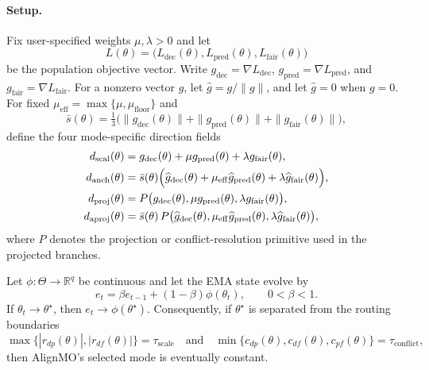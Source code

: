 
\paragraph{Setup.}
Fix user-specified weights $\mu,\lambda>0$ and let
\[
L(\theta)=\bigl(L_{\mathrm{dec}}(\theta),L_{\mathrm{pred}}(\theta),L_{\mathrm{fair}}(\theta)\bigr)
\]
be the population objective vector. Write
$g_{\mathrm{dec}}=\nabla L_{\mathrm{dec}}$,
$g_{\mathrm{pred}}=\nabla L_{\mathrm{pred}}$,
and $g_{\mathrm{fair}}=\nabla L_{\mathrm{fair}}$.
For a nonzero vector $g$, let $\widehat g=g/\|g\|$, and let $\widehat g=0$ when $g=0$.
For fixed $\mu_{\mathrm{eff}}=\max\{\mu,\mu_{\mathrm{floor}}\}$ and
\[
\bar s(\theta)=\tfrac13\bigl(\|g_{\mathrm{dec}}(\theta)\|+\|g_{\mathrm{pred}}(\theta)\|+\|g_{\mathrm{fair}}(\theta)\|\bigr),
\]
define the four mode-specific direction fields
\begin{align*}
d_{\mathrm{scal}}(\theta)
&= g_{\mathrm{dec}}(\theta)+\mu g_{\mathrm{pred}}(\theta)+\lambda g_{\mathrm{fair}}(\theta),\\
d_{\mathrm{anch}}(\theta)
&= \bar s(\theta)\Bigl(\widehat g_{\mathrm{dec}}(\theta)
   +\mu_{\mathrm{eff}}\widehat g_{\mathrm{pred}}(\theta)
   +\lambda \widehat g_{\mathrm{fair}}(\theta)\Bigr),\\
d_{\mathrm{proj}}(\theta)
&= P\bigl(g_{\mathrm{dec}}(\theta),\mu g_{\mathrm{pred}}(\theta),\lambda g_{\mathrm{fair}}(\theta)\bigr),\\
d_{\mathrm{aproj}}(\theta)
&= \bar s(\theta)\,
P\bigl(\widehat g_{\mathrm{dec}}(\theta),
       \mu_{\mathrm{eff}}\widehat g_{\mathrm{pred}}(\theta),
       \lambda \widehat g_{\mathrm{fair}}(\theta)\bigr),
\end{align*}
where $P$ denotes the projection or conflict-resolution primitive used in the projected branches.

\begin{lemma}
\label{lem:alignmo-ema}
Let $\phi:\Theta\to\mathbb R^q$ be continuous and let the EMA state evolve by
\[
e_t=\beta e_{t-1}+(1-\beta)\phi(\theta_t),
\qquad 0<\beta<1.
\]
If $\theta_t\to\theta^\star$, then $e_t\to \phi(\theta^\star)$.
Consequently, if $\theta^\star$ is separated from the routing boundaries
\[
\max\{|r_{dp}(\theta)|,|r_{df}(\theta)|\}=\tau_{\mathrm{scale}}
\quad\text{and}\quad
\min\{c_{dp}(\theta),c_{df}(\theta),c_{pf}(\theta)\}=\tau_{\mathrm{conflict}},
\]
then AlignMO's selected mode is eventually constant.
\end{lemma}


